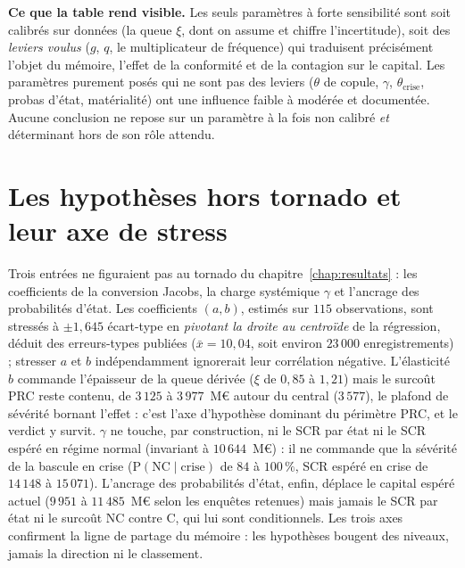 \vspace{4pt}

\textbf{Ce que la table rend visible.} Les seuls paramètres à forte sensibilité sont
soit calibrés sur données (la queue $\xi$, dont on assume et chiffre l'incertitude), soit des
\emph{leviers voulus} ($g$, $q$, le multiplicateur de fréquence) qui traduisent précisément l'objet du mémoire, l'effet de
la conformité et de la contagion sur le capital. Les paramètres purement posés qui
ne sont pas des leviers ($\theta$ de copule, $\gamma$, $\theta_{\text{crise}}$, probas d'état,
matérialité) ont une influence faible à modérée et documentée. Aucune conclusion ne
repose sur un paramètre à la fois non calibré \emph{et} déterminant hors de son rôle attendu.

\section{Les hypothèses hors tornado et leur axe de stress}
\label{sec:ann-hypotheses}

Trois entrées ne figuraient pas au tornado du chapitre~\ref{chap:resultats} : les coefficients
de la conversion Jacobs, la charge systémique $\gamma$ et l'ancrage des probabilités d'état.
Les coefficients $(a,b)$, estimés sur $115$ observations, sont stressés à $\pm 1{,}645$
écart-type en \emph{pivotant la droite au centroïde} de la régression, déduit des erreurs-types
publiées ($\bar{x} = 10{,}04$, soit environ $23\,000$ enregistrements) ; stresser $a$ et $b$
indépendamment ignorerait leur corrélation négative. L'élasticité $b$ commande l'épaisseur de
la queue dérivée ($\xi$ de $0{,}85$ à $1{,}21$) mais le surcoût PRC reste contenu, de $3\,125$
à $3\,977$~M\euro{} autour du central ($3\,577$), le plafond de sévérité bornant l'effet :
c'est l'axe d'hypothèse dominant du périmètre PRC, et le verdict y survit. $\gamma$ ne touche,
par construction, ni le SCR par état ni le SCR espéré en régime normal (invariant à
$10\,644$~M\euro) : il ne commande que la sévérité de la bascule en crise
($\mathrm{P}(\text{NC} \mid \text{crise})$ de $84$ à $100\,\%$, SCR espéré en crise de
$14\,148$ à $15\,071$). L'ancrage des probabilités d'état, enfin, déplace le capital espéré
actuel ($9\,951$ à $11\,485$~M\euro{} selon les enquêtes retenues) mais jamais le SCR par état
ni le surcoût NC contre C, qui lui sont conditionnels. Les trois axes confirment la ligne de
partage du mémoire : les hypothèses bougent des niveaux, jamais la direction ni le classement.

